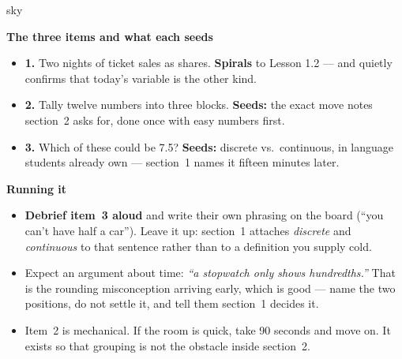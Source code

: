 \documentclass[10pt]{article}
\begin{document}
\boxguard[20]
\begin{skillbox}{sky}
\begin{minipage}[t]{0.48\linewidth}
    \textbf{The three items and what each seeds}
    \begin{itemize}
        \item \textbf{1.} Two nights of ticket sales as shares. \textbf{Spirals} to Lesson 1.2
              --- and quietly confirms that today's variable is the other kind.
        \item \textbf{2.} Tally twelve numbers into three blocks. \textbf{Seeds:} the exact move
              notes section~2 asks for, done once with easy numbers first.
        \item \textbf{3.} Which of these could be 7.5? \textbf{Seeds:} discrete vs.\ continuous,
              in language students already own --- section~1 names it fifteen minutes later.
    \end{itemize}
\end{minipage}
\hfill
\begin{minipage}[t]{0.48\linewidth}
    \textbf{Running it}
    \begin{itemize}
        \item \textbf{Debrief item~3 aloud} and write their own phrasing on the board
              (``you can't have half a car''). Leave it up: section~1 attaches
              \emph{discrete} and \emph{continuous} to that sentence rather than to a
              definition you supply cold.
        \item Expect an argument about time: \emph{``a stopwatch only shows hundredths.''}
              That is the rounding misconception arriving early, which is good --- name the
              two positions, do not settle it, and tell them section~1 decides it.
        \item Item~2 is mechanical. If the room is quick, take 90 seconds and move on. It
              exists so that grouping is not the obstacle inside section~2.
    \end{itemize}
\end{minipage}
\end{skillbox}
\end{document}
